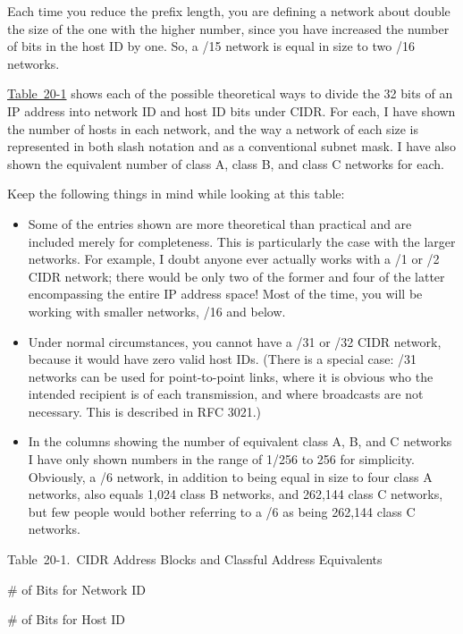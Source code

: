 Each time you reduce the prefix length, you are defining a network about
double the size of the one with the higher number, since you have
increased the number of bits in the host ID by one. So, a /15 network is
equal in size to two /16 networks.

\protect\hyperlink{ch20s03.htmlux5cux23cidr_address_blocks_and_classful_address}{Table~20-1}
shows each of the possible theoretical ways to divide the 32 bits of an
IP address into network ID and host ID bits under CIDR. For each, I have
shown the number of hosts in each network, and the way a network of each
size is represented in both slash notation and as a conventional subnet
mask. I have also shown the equivalent number of class A, class B, and
class C networks for each.

Keep the following things in mind while looking at this table:

\begin{itemize}
\item
  Some of the entries shown are more theoretical than practical and are
  included merely for completeness. This is particularly the case with
  the larger networks. For example, I doubt anyone ever actually works
  with a /1 or /2 CIDR network; there would be only two of the former
  and four of the latter encompassing the entire IP address space! Most
  of the time, you will be working with smaller networks, /16 and below.
\item
  Under normal circumstances, you cannot have a /31 or /32 CIDR network,
  because it would have zero valid host IDs. (There is a special case:
  /31 networks can be used for point-to-point links, where it is obvious
  who the intended recipient is of each transmission, and where
  broadcasts are not necessary. This is described in RFC 3021.)
\item
  In the columns showing the number of equivalent class A, B, and C
  networks I have only shown numbers in the range of 1/256 to 256 for
  simplicity. Obviously, a /6 network, in addition to being equal in
  size to four class A networks, also equals 1,024 class B networks, and
  262,144 class C networks, but few people would bother referring to a
  /6 as being 262,144 class C networks.
\end{itemize}



Table~20-1.~CIDR Address Blocks and Classful Address Equivalents

\# of Bits for Network ID

\# of Bits for Host ID

